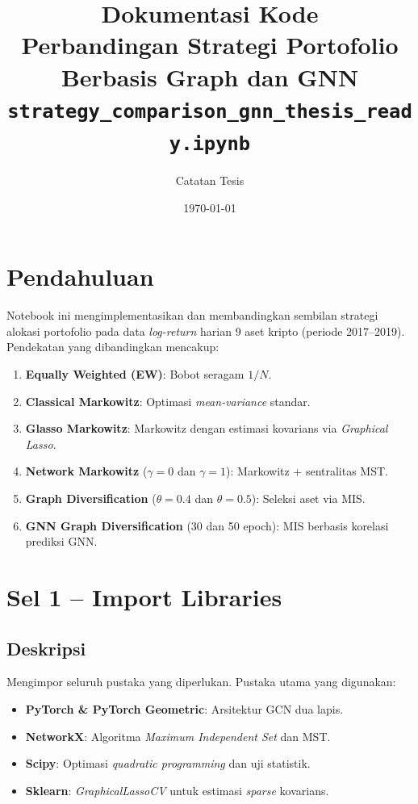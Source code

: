 \documentclass[12pt,a4paper]{article}
\title{\textbf{Dokumentasi Kode} \\ \large Perbandingan Strategi Portofolio Berbasis Graph dan GNN \\
\small \texttt{strategy\_comparison\_gnn\_thesis\_ready.ipynb}}
\author{Catatan Tesis}
\date{\today}
\begin{document}
\maketitle
\tableofcontents
\newpage

\section{Pendahuluan}
Notebook ini mengimplementasikan dan membandingkan sembilan strategi alokasi portofolio
pada data \textit{log-return} harian 9 aset kripto (periode 2017--2019). Pendekatan yang
dibandingkan mencakup:
\begin{enumerate}
    \item \textbf{Equally Weighted (EW)}: Bobot seragam $1/N$.
    \item \textbf{Classical Markowitz}: Optimasi \textit{mean-variance} standar.
    \item \textbf{Glasso Markowitz}: Markowitz dengan estimasi kovarians via \textit{Graphical Lasso}.
    \item \textbf{Network Markowitz} ($\gamma=0$ dan $\gamma=1$): Markowitz + sentralitas MST.
    \item \textbf{Graph Diversification} ($\theta=0.4$ dan $\theta=0.5$): Seleksi aset via MIS.
    \item \textbf{GNN Graph Diversification} (30 dan 50 epoch): MIS berbasis korelasi prediksi GNN.
\end{enumerate}

\section{Sel 1 -- Import Libraries}

\subsection{Deskripsi}
Mengimpor seluruh pustaka yang diperlukan. Pustaka utama yang digunakan:
\begin{itemize}
    \item \textbf{PyTorch \& PyTorch Geometric}: Arsitektur GCN dua lapis.
    \item \textbf{NetworkX}: Algoritma \textit{Maximum Independent Set} dan MST.
    \item \textbf{Scipy}: Optimasi \textit{quadratic programming} dan uji statistik.
    \item \textbf{Sklearn}: \textit{GraphicalLassoCV} untuk estimasi \textit{sparse} kovarians.
\end{itemize}
\end{document}
